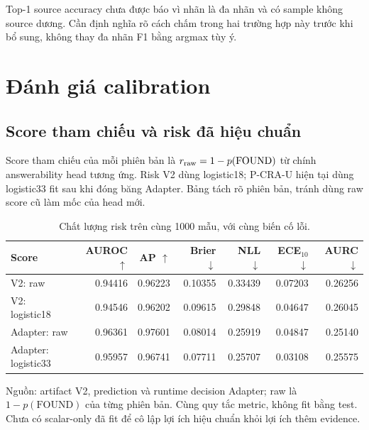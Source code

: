 Top-1 source accuracy chưa được báo vì nhãn là đa
nhãn và có sample không source dương. Cần định nghĩa
rõ cách chấm trong hai trường hợp này trước khi
bổ sung, không thay đa nhãn F1 bằng argmax tùy ý.

\section{Đánh giá calibration}
\label{sec:results-calibration}

\subsection{Score tham chiếu và risk đã hiệu chuẩn}

Score tham chiếu của mỗi phiên bản là $r_{\rm raw}=1-p(\mathrm{FOUND})$
từ chính answerability head tương ứng. Risk V2 dùng logistic18;
P-CRA-U hiện tại dùng logistic33 fit sau khi đóng băng Adapter.
Bảng tách rõ phiên bản, tránh dùng raw score cũ làm mốc của head mới.

\begin{table}[htbp]
    \centering
    \setlength{\tabcolsep}{4pt}
    \renewcommand{\arraystretch}{1.15}
    \caption{Chất lượng risk trên cùng 1000 mẫu, với cùng biến cố lỗi.}
    \label{tab:results-calibration-comparison}
    \small
    \begin{tabularx}{\textwidth}{@{}>{\raggedright\arraybackslash}Xrrrrrr@{}}
        \toprule
        Score & \shortstack{AUROC\\$\uparrow$} & \shortstack{AP\\$\uparrow$} &
        \shortstack{Brier\\$\downarrow$} & \shortstack{NLL\\$\downarrow$} &
        \shortstack{ECE$_{10}$\\$\downarrow$} & \shortstack{AURC\\$\downarrow$} \\
        \midrule
        V2: raw & 0.94416 & 0.96223 & 0.10355 & 0.33439 & 0.07203 & 0.26256 \\
        V2: logistic18 & 0.94546 & 0.96202 & 0.09615 & 0.29848 & 0.04647 & 0.26045 \\
        \midrule
        Adapter: raw & 0.96361 & 0.97601 & 0.08014 & 0.25919 & 0.04847 & 0.25140 \\
        Adapter: logistic33 & 0.95957 & 0.96741 & 0.07711 & 0.25707 & 0.03108 & 0.25575 \\
        \bottomrule
    \end{tabularx}
    {\footnotesize\raggedright Nguồn: artifact V2, prediction và runtime decision
    Adapter; raw là $1-p(\mathrm{FOUND})$ của từng phiên bản.
    Cùng quy tắc metric, không fit bằng test. Chưa có scalar-only đã fit
    để cô lập lợi ích hiệu chuẩn khỏi lợi ích thêm evidence.\par}
\end{table}

